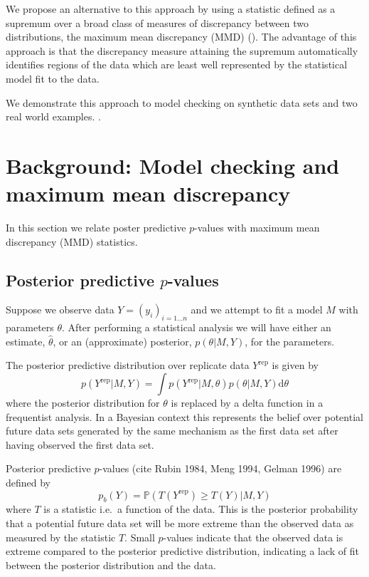 \documentclass{article} %
\def\ie{i.e.\ }
\begin{document}
We propose an alternative to this approach by using a statistic defined as a supremum over a broad class of measures of discrepancy between two distributions, the maximum mean discrepancy (MMD)  ().
The advantage of this approach is that the discrepancy measure attaining the supremum automatically identifies regions of the data which are least well represented by the statistical model fit to the data.

We demonstrate this approach to model checking on synthetic data sets and two real world examples.
.

\section{Background: Model checking and maximum mean discrepancy}

In this section we relate poster predictive $p$-values with maximum mean discrepancy (MMD)  statistics.

\subsection{Posterior predictive $p$-values}

Suppose we observe data $Y = (y_i)_{i=1\ldots n}$ and we attempt to fit a model $M$ with parameters $\theta$.
After performing a statistical analysis we will have either an estimate, $\hat\theta$, or an (approximate) posterior, $p(\theta|M,Y)$, for the parameters.

The posterior predictive distribution over replicate data $Y^\textrm{rep}$ is given by
\begin{equation}
p(Y^\textrm{rep}|M,Y) = \int p(Y^\textrm{rep}|M,\theta)p(\theta|M,Y)\mathrm{d}\theta
\end{equation}
where the posterior distribution for $\theta$ is replaced by a delta function in a frequentist analysis.
In a Bayesian context this represents the belief over potential future data sets generated by the same mechanism as the first data set after having observed the first data set.

Posterior predictive $p$-values (cite Rubin 1984, Meng 1994, Gelman 1996) are defined by
\begin{equation}
p_b(Y) = \mathbb{P}(T(Y^\textrm{rep})\geq T(Y)|M,Y)
\end{equation}
where $T$ is a statistic \ie a function of the data.
This is the posterior probability that a potential future data set will be more extreme than the observed data as measured by the statistic $T$.
Small $p$-values indicate that the observed data is extreme compared to the posterior predictive distribution, indicating a lack of fit between the posterior distribution and the data.
\end{document}
